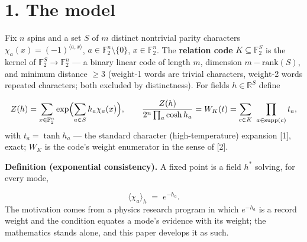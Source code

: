 \documentclass[11pt]{article}
\begin{document}
\section*{1. The model}
Fix $n$ spins and a set $S$ of $m$ distinct nontrivial parity characters $\chi_a(x) = (-1)^{\langle a, x\rangle}$, $a \in \mathbb F_2^n\setminus\{0\}$, $x \in \mathbb F_2^n$.  The \textbf{relation code} $K \subseteq \mathbb F_2^S$ is the kernel of $\mathbb F_2^S \to \mathbb F_2^n$ — a binary linear code of length $m$, dimension $m - \mathrm{rank}(S)$, and minimum distance $\ge 3$ (weight-1 words are trivial characters, weight-2 words repeated characters; both excluded by distinctness).  For fields $h \in \mathbb R^S$ define

\[
Z(h) = \sum_{x\in\mathbb F_2^n} \exp\Bigl(\sum_{a\in S} h_a
\chi_a(x)\Bigr), \qquad
\frac{Z(h)}{2^n\prod_a \cosh h_a} = W_K(t) =
\sum_{c\in K}\ \prod_{a\in\mathrm{supp}(c)} t_a,
\]
with $t_a = \tanh h_a$ — the standard character (high-temperature) expansion [1], exact; $W_K$ is the code's weight enumerator in the sense of [2].

\textbf{Definition (exponential consistency).}  A fixed point is a field $h^*$ solving, for every mode,

\[
\langle\chi_a\rangle_{h} \;=\; e^{-h_a}.
\]
The motivation comes from a physics research program in which $e^{-h_a}$ is a record weight and the condition equates a mode's evidence with its weight; the mathematics stands alone, and this paper develops it as such.
\end{document}
